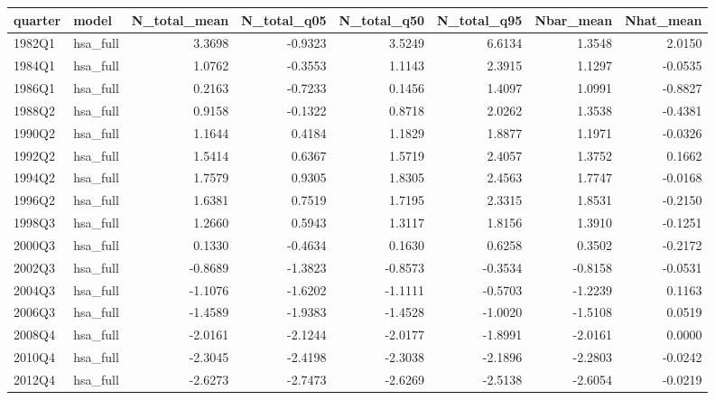 \begin{tabular}{llrrrrrr}
\toprule
quarter & model & N\_total\_mean & N\_total\_q05 & N\_total\_q50 & N\_total\_q95 & Nbar\_mean & Nhat\_mean \\
\midrule
1982Q1 & hsa\_full & 3.3698 & -0.9323 & 3.5249 & 6.6134 & 1.3548 & 2.0150 \\
1984Q1 & hsa\_full & 1.0762 & -0.3553 & 1.1143 & 2.3915 & 1.1297 & -0.0535 \\
1986Q1 & hsa\_full & 0.2163 & -0.7233 & 0.1456 & 1.4097 & 1.0991 & -0.8827 \\
1988Q2 & hsa\_full & 0.9158 & -0.1322 & 0.8718 & 2.0262 & 1.3538 & -0.4381 \\
1990Q2 & hsa\_full & 1.1644 & 0.4184 & 1.1829 & 1.8877 & 1.1971 & -0.0326 \\
1992Q2 & hsa\_full & 1.5414 & 0.6367 & 1.5719 & 2.4057 & 1.3752 & 0.1662 \\
1994Q2 & hsa\_full & 1.7579 & 0.9305 & 1.8305 & 2.4563 & 1.7747 & -0.0168 \\
1996Q2 & hsa\_full & 1.6381 & 0.7519 & 1.7195 & 2.3315 & 1.8531 & -0.2150 \\
1998Q3 & hsa\_full & 1.2660 & 0.5943 & 1.3117 & 1.8156 & 1.3910 & -0.1251 \\
2000Q3 & hsa\_full & 0.1330 & -0.4634 & 0.1630 & 0.6258 & 0.3502 & -0.2172 \\
2002Q3 & hsa\_full & -0.8689 & -1.3823 & -0.8573 & -0.3534 & -0.8158 & -0.0531 \\
2004Q3 & hsa\_full & -1.1076 & -1.6202 & -1.1111 & -0.5703 & -1.2239 & 0.1163 \\
2006Q3 & hsa\_full & -1.4589 & -1.9383 & -1.4528 & -1.0020 & -1.5108 & 0.0519 \\
2008Q4 & hsa\_full & -2.0161 & -2.1244 & -2.0177 & -1.8991 & -2.0161 & 0.0000 \\
2010Q4 & hsa\_full & -2.3045 & -2.4198 & -2.3038 & -2.1896 & -2.2803 & -0.0242 \\
2012Q4 & hsa\_full & -2.6273 & -2.7473 & -2.6269 & -2.5138 & -2.6054 & -0.0219 \\
\bottomrule
\end{tabular}
